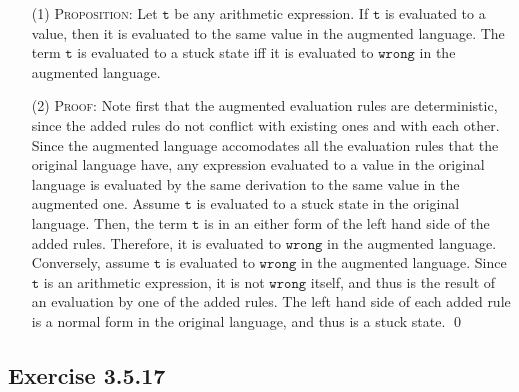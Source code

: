 \documentclass{article}
\newcommand{\code}[1]{\texttt{#1}}
\newcommand{\Ex}[1]{\subsection*{Exercise #1}}
\newcommand{\Wrong}{\code{wrong}}
\begin{document}
\begin{itemize}
  \item[(1)]
    \textsc{Proposition}:
    Let $\code t$ be any arithmetic expression.
    If $\code t$ is evaluated to a value,
      then it is evaluated to the same value in the augmented language.
    The term $\code t$ is evaluated to a stuck state
      iff it is evaluated to $\Wrong$ in the augmented language.
  \item[(2)] 
    \textsc{Proof}:
    Note first that the augmented evaluation rules are deterministic,
      since the added rules do not conflict with existing ones and with each other.
    Since the augmented language accomodates all the evaluation rules that
      the original language have,
      any expression evaluated to a value in the original language
      is evaluated by the same derivation to the same value in the augmented one.
    Assume $\code t$ is evaluated to a stuck state in the original language.
    Then, the term $\code t$ is in an either form of the left hand side of
      the added rules.
    Therefore, it is evaluated to $\Wrong$ in the augmented language.
    Conversely, assume $\code t$ is evaluated to $\Wrong$ in the augmented language.
    Since $\code t$ is an arithmetic expression,
      it is not $\Wrong$ itself,
      and thus is the result of an evaluation by one of the added rules.
    The left hand side of each added rule is a normal form in the original language,
      and thus is a stuck state. \qed
\end{itemize}

\Ex{3.5.17}
\end{document}
